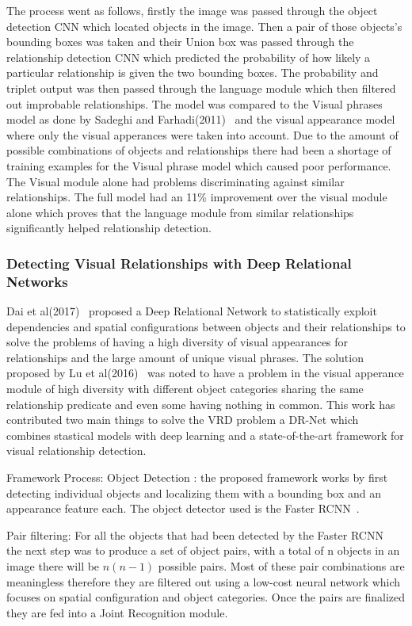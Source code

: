 \documentclass{csfyp}
\begin{document}
The process went as follows, firstly the image was passed through the object detection CNN which located objects in the image. Then a pair of those objects’s bounding boxes was taken and their Union box was passed through the relationship detection CNN which predicted the probability of how likely a particular relationship is given the two bounding boxes. The probability and triplet output was then passed through the language module which then filtered out improbable relationships. The model was compared to the Visual phrases model as done  by Sadeghi and Farhadi(2011)~\cite{VisualPhrases} and the visual appearance model where only the visual apperances were taken into account. Due to the amount of possible combinations of objects and relationships there had been a shortage of training examples for the Visual phrase model which caused poor performance. The Visual module alone had problems discriminating against similar relationships. The full model had an 11\% improvement over the visual module alone which proves that the language module from similar relationships significantly helped relationship detection. 

\subsubsection{Detecting Visual Relationships with Deep Relational Networks}
Dai et al(2017)~\cite{Dai2017DetectingVR} proposed a Deep Relational Network to statistically exploit dependencies and spatial configurations between objects and their relationships to solve the problems of having a high diversity of visual appearances for relationships and the large amount of unique visual phrases. The solution proposed by Lu et al(2016)~\cite{lu2016visual} was noted to have a problem in the visual apperance module of high diversity with different object categories sharing the same relationship predicate and even some having nothing in common. This work has contributed two main things to solve the VRD problem a DR-Net which combines stastical models with deep learning and a state-of-the-art framework for visual relationship detection. 

Framework Process:
Object Detection : the proposed framework works by first detecting individual objects and localizing them with a bounding box and an appearance feature each. The object detector used is the Faster RCNN~\cite{NIPS2015_5638}.

Pair filtering:
For all the objects that had been detected by the Faster RCNN~\cite{NIPS2015_5638} the next step was to produce a set of object pairs, with a total of n objects in an image there will be $n(n-1)$ possible pairs. Most of these pair combinations are meaningless therefore they are filtered out using a low-cost neural network which focuses on spatial configuration and object categories. Once the pairs are finalized they are fed into a Joint Recognition module.
\end{document}

